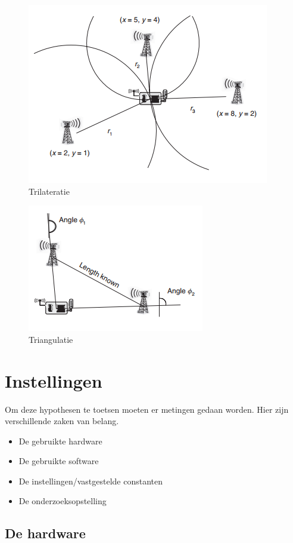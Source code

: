 \documentclass{article}
\begin{document}
\begin{figure}[h]
\centering\includegraphics[scale=0.75]{trilateratie.png}
\caption{Trilateratie \cite{h9}}
\label{trilateratie}
\end{figure}
\begin{figure}[h]
\centering\includegraphics[scale=0.75]{triangulatie.png}
\caption{Triangulatie \cite{h9}}
\label{triangulatie}
\end{figure}

\section{Instellingen}
Om deze hypothesen te toetsen moeten er metingen gedaan worden. Hier zijn verschillende zaken van belang. 
\begin{itemize}
	\item De gebruikte hardware
	\item De gebruikte software
	\item De instellingen/vastgestelde constanten
	\item De onderzoeksopstelling
\end{itemize}
\subsection{De hardware}
\end{document}
